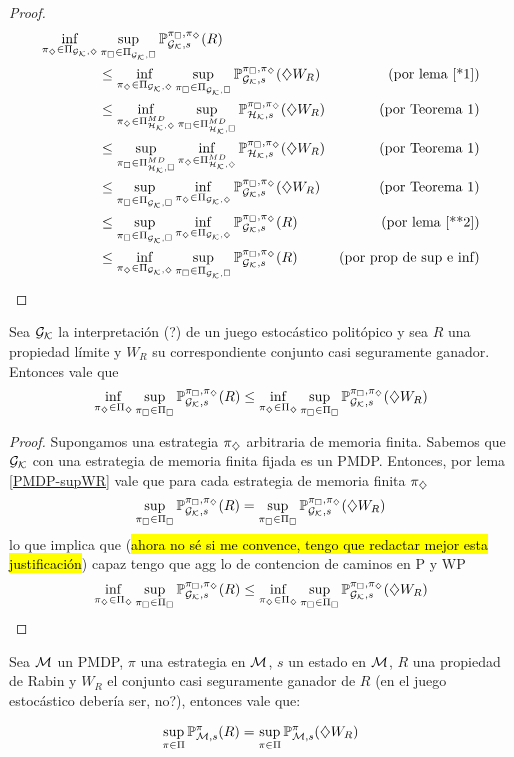 \begin{proof}
	\begin{align*}
		\inf_{\piGdiam} &\sup_{\piGcuad} \ProbG(R) \\
		&\leq \inf_{\piGdiam} \sup_{\piGcuad} \ProbG(\alc W_R)
		& (\text{por lema } \ref{*1})
		\\
		&\leq \inf_{\piHdiamMD} \sup_{\piHcuadMD} \ProbH(\alc W_R)
		& \text{(por Teorema 1)}
		\\
		&\leq \sup_{\piHcuadMD} \inf_{\piHdiamMD} \ProbH(\alc W_R)
		& \text{(por Teorema 1)}
		\\
		&\leq \sup_{\piGcuad} \inf_{\piGdiam} \ProbG(\alc W_R)
		& \text{(por Teorema 1)}
		\\
		&\leq \sup_{\piGcuad} \inf_{\piGdiam} \ProbG(R)
		& (\text{por lema } \ref{**2})
		\\
		&\leq \inf_{\piGdiam} \sup_{\piGcuad} \ProbG(R)
		& \text{(por prop de sup e inf)}
	\end{align*}
\end{proof}

\begin{lemma}
	\label{*1}
	Sea $\Gk$ la interpretación (?) de un juego estocástico politópico y sea $R$ una propiedad límite y $W_R$ su correspondiente conjunto casi seguramente ganador. Entonces vale que
	$$
		\inf_{\pidiamset} \sup_{\picuadset} \ProbG (R) \leq \inf_{\pidiamset} \sup_{\picuadset} \ProbG (\alc W_R)
	$$
\end{lemma}

\begin{proof}
	Supongamos una estrategia $\pidiam$ arbitraria de memoria finita. Sabemos que $\Gk$ con una estrategia de memoria finita fijada es un PMDP. Entonces, por lema \ref{PMDP-supWR} vale que para cada estrategia de memoria finita $\pidiam$
	$$
		\sup_{\picuadset} \ProbG (R) = \sup_{\picuadset} \ProbG (\alc W_R)
	$$
	lo que implica que (\hl{ahora no sé si me convence, tengo que redactar mejor esta justificación})
	capaz tengo que agg lo de contencion de caminos en P y WP
	$$
		\inf_{\pidiamset} \sup_{\picuadset} \ProbG (R) \leq \inf_{\pidiamset} \sup_{\picuadset} \ProbG (\alc W_R)
	$$
\end{proof}

\begin{lemma}
	\label{PMDP-supWR}
	Sea $\M$ un PMDP, $\pi$ una estrategia en $\M$, $s$ un estado en $\M$, $R$ una propiedad de Rabin y $W_R$ el conjunto casi seguramente ganador de $R$ (en el juego estocástico debería ser, no?), entonces vale que:


	$$
		\sup_{\pi \in \Pi} \ProbPMDP (R) = \sup_{\pi \in \Pi} \ProbPMDP (\alc W_R)
	$$
\end{lemma}


